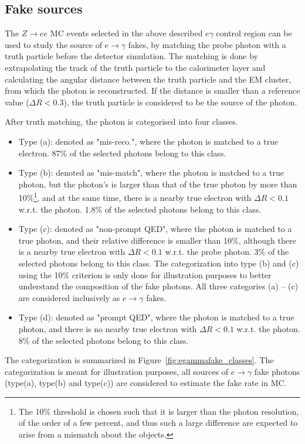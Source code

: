 
\FloatBarrier
\subsection{Fake sources}
\label{sec:egammafakes_source}

The $Z\to ee$ MC events selected in the above described $e\gamma$ control region can be used to study the source of $e\to\gamma$ fakes, by matching the probe photon with a truth particle before the detector simulation.
The matching is done by extrapolating the track of the truth particle to the calorimeter layer and calculating the angular distance between the truth particle and the EM cluster, from which the photon is reconstructed.
If the distance is smaller than a reference value ($\Delta R < 0.3$), the truth particle is considered to be the source of the photon.

After truth matching, the photon is categorised into four classes.
\begin{itemize}
\item Type (a): denoted as "mis-reco.", where the photon is matched to a true electron. 87\% of the selected photons belong to this class.
\item Type (b): denoted as "mis-match", where the photon is matched to a true photon, but the photon's \pt is larger than that of the true photon by more than 10\%\footnote{The 10\% threshold is chosen such that it is larger than the photon \pt resolution, of the order of a few percent, and thus such a large difference are expected to arise from a mismatch about the objects.}, and at the same time, there is a nearby true electron with $\Delta R < 0.1$ w.r.t. the photon. 
1.8\% of the selected photons belong to this class.
\item Type (c): denoted as "non-prompt QED", where the photon is matched to a true photon, and their relative \pt difference is smaller than 10\%, although there is a nearby true electron with $\Delta R < 0.1$ w.r.t. the probe photon. 3\% of the selected photons belong to this class. The categorization into type (b) and (c) using the 10\% criterion is only done for illustration purposes to better understand the composition of the fake photons. All three categories (a) -- (c) are considered inclusively as $e\rightarrow \gamma$ fakes. %

\item Type (d): denoted as "prompt QED", where the photon is matched to a true photon, and there is no nearby true electron with $\Delta R < 0.1$ w.r.t. the photon. 
8\% of the selected photons belong to this class. 
\end{itemize}
The categorization is summarized in Figure~\ref{fig:egammafake_classes}. The categorization is meant for illustration purposes, all sources of $e\rightarrow \gamma$ fake photons (type(a), type(b) and type(c)) are considered to estimate the fake rate in MC. 


